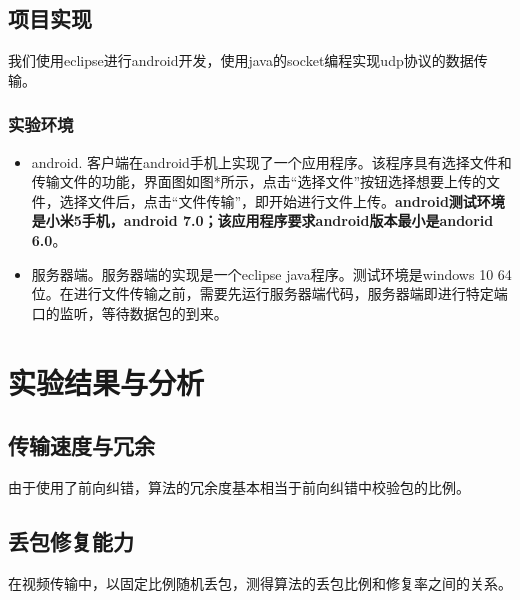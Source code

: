\documentclass{article}
\begin{document}
\begin{CJK*}{UTF8}{gbsn}
\subsection{项目实现}
我们使用eclipse进行android开发，使用java的socket编程实现udp协议的数据传输。
\subsubsection{实验环境}
\begin{itemize}
\item android. 客户端在android手机上实现了一个应用程序。该程序具有选择文件和传输文件的功能，界面图如图*所示，点击“选择文件”按钮选择想要上传的文件，选择文件后，点击“文件传输”，即开始进行文件上传。\textbf{android测试环境是小米5手机，android 7.0；该应用程序要求android版本最小是andorid 6.0}。
\item 服务器端。服务器端的实现是一个eclipse java程序。测试环境是windows 10 64位。在进行文件传输之前，需要先运行服务器端代码，服务器端即进行特定端口的监听，等待数据包的到来。 
\end{itemize}
\section{实验结果与分析}
\subsection{传输速度与冗余}
由于使用了前向纠错，算法的冗余度基本相当于前向纠错中校验包的比例。
\subsection{丢包修复能力}
在视频传输中，以固定比例随机丢包，测得算法的丢包比例和修复率之间的关系。
\end{CJK*}
\end{document}
